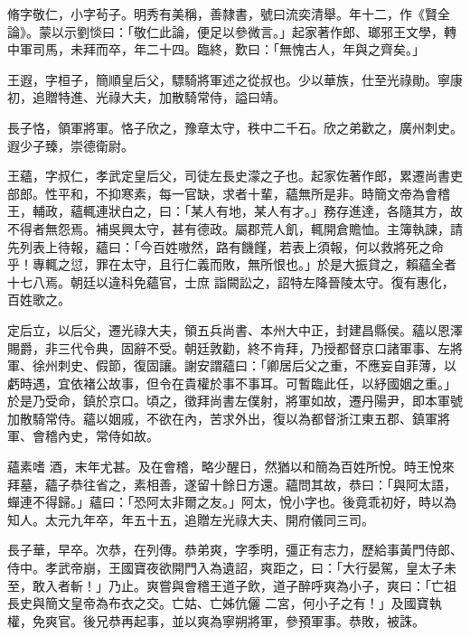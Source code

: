 \begin{pinyinscope}
 脩字敬仁，小字茍子。明秀有美稱，善隸書，號曰流奕清舉。年十二，作《賢全論》。蒙以示劉惔曰：「敬仁此論，便足以參微言。」起家著作郎、瑯邪王文學，轉中軍司馬，未拜而卒，年二十四。臨終，歎曰：「無愧古人，年與之齊矣。」



 王遐，字桓子，簡順皇后父，驃騎將軍述之從叔也。少以華族，仕至光祿勛。寧康初，追贈特進、光祿大夫，加散騎常侍，謚曰靖。



 長子恪，領軍將軍。恪子欣之，豫章太守，秩中二千石。欣之弟歡之，廣州刺史。遐少子臻，崇德衛尉。



 王蘊，字叔仁，孝武定皇后父，司徒左長史濛之子也。起家佐著作郎，累遷尚書吏部郎。性平和，不抑寒素，每一官缺，求者十輩，蘊無所是非。時簡文帝為會稽王，輔政，蘊輒連狀白之，曰：「某人有地，某人有才。」務存進達，各隨其方，故不得者無怨焉。補吳興太守，甚有德政。屬郡荒人飢，輒開倉贍恤。主簿執諫，請先列表上待報，蘊曰：「今百姓嗷然，路有饑饉，若表上須報，何以救將死之命乎！專輒之愆，罪在太守，且行仁義而敗，無所恨也。」於是大振貸之，賴蘊全者十七八焉。朝廷以違科免蘊官，士庶
 詣闕訟之，詔特左降晉陵太守。復有惠化，百姓歌之。



 定后立，以后父，遷光祿大夫，領五兵尚書、本州大中正，封建昌縣侯。蘊以恩澤賜爵，非三代令典，固辭不受。朝廷敦勸，終不肯拜，乃授都督京口諸軍事、左將軍、徐州刺史、假節，復固讓。謝安謂蘊曰：「卿居后父之重，不應妄自菲薄，以虧時遇，宜依褚公故事，但令在貴權於事不事耳。可暫臨此任，以紓國姻之重。」於是乃受命，鎮於京口。頃之，徵拜尚書左僕射，將軍如故，遷丹陽尹，即本軍號加散騎常侍。蘊以姻戚，不欲在內，苦求外出，復以為都督浙江東五郡、鎮軍將軍、會稽內史，常侍如故。



 蘊素嗜
 酒，末年尤甚。及在會稽，略少醒日，然猶以和簡為百姓所悅。時王悅來拜墓，蘊子恭往省之，素相善，遂留十餘日方還。蘊問其故，恭曰：「與阿太語，蟬連不得歸。」蘊曰：「恐阿太非爾之友。」阿太，悅小字也。後竟乖初好，時以為知人。太元九年卒，年五十五，追贈左光祿大夫、開府儀同三司。



 長子華，早卒。次恭，在列傳。恭弟爽，字季明，彊正有志力，歷給事黃門侍郎、侍中。孝武帝崩，王國寶夜欲開門入為遺詔，爽距之，曰：「大行晏駕，皇太子未至，敢入者斬！」乃止。爽嘗與會稽王道子飲，道子醉呼爽為小子，爽曰：「亡祖長史與簡文皇帝為布衣之交。亡姑、亡姊伉儷
 二宮，何小子之有！」及國寶執權，免爽官。後兄恭再起事，並以爽為寧朔將軍，參預軍事。恭敗，被誅。




\end{pinyinscope}
